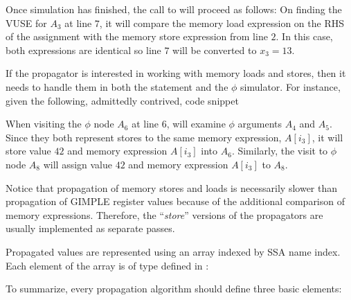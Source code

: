 Once simulation has finished, the call to
 will proceed as follows: On finding
the VUSE for $A_3$ at line $7$, it will compare the memory load
expression on the RHS of the assignment with the memory store
expression from line $2$.  In this case, both expressions are
identical so line $7$ will be converted to $x_3 = 13$.

If the propagator is interested in working with memory loads and
stores, then it needs to handle them in both the statement and
the $\phi$ simulator.  For instance, given the following,
admittedly contrived, code snippet

\begin{center}
\parbox{2in}{}
\end{center}

When visiting the $\phi$ node $A_6$ at line $6$,
 will examine $\phi$ arguments $A_4$
and $A_5$.  Since they both represent stores to the same memory
expression, $A[i_3]$, it will store value $42$ and memory
expression $A[i_3]$ into $A_6$.  Similarly, the visit to $\phi$
node $A_8$ will assign value $42$ and memory expression $A[i_3]$
to $A_8$.

Notice that propagation of memory stores and loads is necessarily
slower than propagation of GIMPLE register values because of the
additional comparison of memory expressions.  Therefore, the
``\textit{store}'' versions of the propagators are usually
implemented as separate passes.

Propagated values are represented using an array indexed by SSA
name index.  Each element of the array is of type
 defined in :

\begin{center}
\parbox{2in}{}
\end{center}

To summarize, every propagation algorithm should define three
basic elements:

